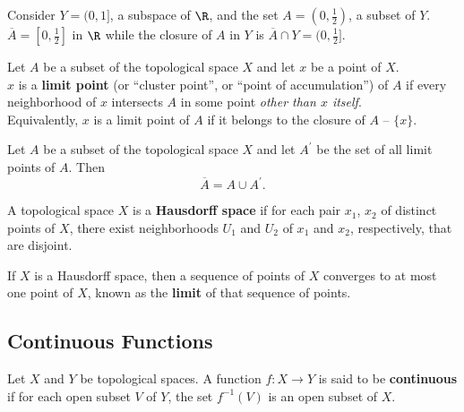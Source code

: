 \begin{eg}
Consider $Y = (0, 1]$, a subspace of $\R$, and the set $A = (0, \frac{1}{2})$, a subset of $Y$. \\

$\overline{A} = [0, \frac{1}{2}]$ in $\R$ while the closure of $A$ in $Y$ is $\overline{A} \cap Y  = (0, \frac{1}{2}]$. 
\end{eg}

\begin{definition}
Let $A$ be a subset of the topological space $X$ and let $x$ be a point of $X$. \\

$x$ is a \textbf{limit point} (or ``cluster point'', or ``point of accumulation'') of $A$ if every neighborhood of $x$ intersects $A$
in some point \textit{other than $x$ itself}. \\

Equivalently, $x$ is a limit point of $A$ if it belongs to the closure of $A \text{ -- } \{ x \}$.
\end{definition}

\begin{theorem}
Let $A$ be a subset of the topological space $X$ and let $A^{\prime}$ be the set of all limit points of $A$. Then
\[
    \overline{A} = A \cup A^{\prime}. 
\]
\end{theorem}

\begin{definition}
A topological space $X$ is a \textbf{Hausdorff space} if for each pair $x_1$, $x_2$ of distinct points of $X$, there exist
neighborhoods $U_1$ and $U_2$ of $x_1$ and $x_2$, respectively, that are disjoint.
\end{definition}

\begin{theorem}
If $X$ is a Hausdorff space, then a sequence of points of $X$ converges to at most one point of $X$, known as the \textbf{limit} of that sequence of points.
\end{theorem}

\subsection{Continuous Functions}

\begin{definition}
Let $X$ and $Y$ be topological spaces. A function $f \colon X \rightarrow Y$ is said to be \textbf{continuous} if for each open subset $V$ of $Y$,
the set $f^{-1}(V)$ is an open subset of $X$.
\end{definition}

